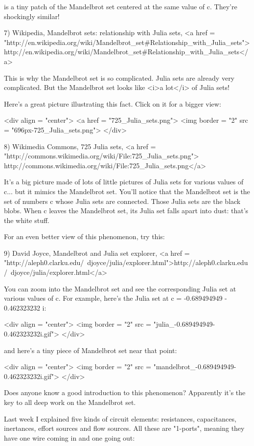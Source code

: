 is a tiny patch of the Mandelbrot set centered at the
same value of c.  They're shockingly similar!

7) Wikipedia, Mandelbrot sets: relationship with Julia sets,
<a href = "http://en.wikipedia.org/wiki/Mandelbrot_set#Relationship_with_Julia_sets">http://en.wikipedia.org/wiki/Mandelbrot_set#Relationship_with_Julia_sets</a>

This is why the Mandelbrot set is so complicated.  Julia sets are
already very complicated.  But the Mandelbrot set looks like <i>a
lot</i> of Julia sets!

Here's a great picture illustrating this fact.  Click on it for a bigger
view:

<div align = "center">
<a href = "725_Julia_sets.png">
<img border = "2" src = "696px-725_Julia_sets.png">
</div>

8) Wikimedia Commons, 725 Julia sets,
<a href = "http://commons.wikimedia.org/wiki/File:725_Julia_sets.png">
http://commons.wikimedia.org/wiki/File:725_Julia_sets.png</a>

It's a big picture made of lots of little pictures of Julia sets for
various values of c...  but it mimics the Mandelbrot set.  You'll
notice that the Mandelbrot set is the set of numbers c whose Julia
sets are connected.  Those Julia sets are the black blobs.  When c
leaves the Mandelbrot set, its Julia set falls apart into dust: that's
the white stuff.

For an even better view of this phenomenon, try this:

9) David Joyce, Mandelbrot and Julia set explorer, 
<a href = "http://aleph0.clarku.edu/~djoyce/julia/explorer.html">http://aleph0.clarku.edu/~djoyce/julia/explorer.html</a>

You can zoom into the Mandelbrot set and see the corresponding Julia
set at various values of c.  For example, here's the Julia set at
c = -0.689494949 - 0.462323232 i:

<div align = "center">
<img border = "2" src = "julia_-0.689494949-0.462323232i.gif">
</div>

and here's a tiny piece of Mandelbrot set near that point:

<div align = "center">
<img border = "2" src = "mandelbrot_-0.689494949-0.462323232i.gif">
</div>

Does anyone know a good introduction to this phenomenon?  Apparently
it's the key to all deep work on the Mandelbrot set.

Last week I explained five kinds of circuit elements: resistances,
capacitances, inertances, effort sources and flow sources.  All these
are "1-ports", meaning they have one wire coming in and one
going out:

